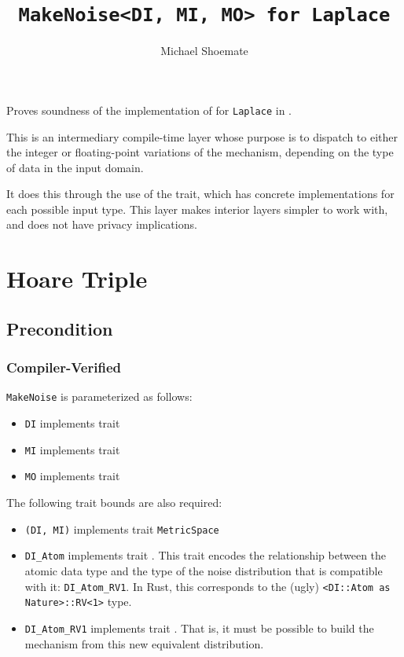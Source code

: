 \documentclass{article}
\title{\texttt{MakeNoise<DI, MI, MO> for Laplace}}
\author{Michael Shoemate}
\date{}
\begin{document}
\maketitle

\contrib
Proves soundness of the implementation of  
for \texttt{Laplace} in .

This is an intermediary compile-time layer whose purpose is 
to dispatch to either the integer or floating-point variations of the mechanism,
depending on the type of data in the input domain.

It does this through the use of the  trait,
which has concrete implementations for each possible input type.
This layer makes interior layers simpler to work with, and does not have privacy implications.

\section{Hoare Triple}
\subsection*{Precondition}
\subsubsection*{Compiler-Verified}
\texttt{MakeNoise} is parameterized as follows:
\begin{itemize}
    \item \texttt{DI} implements trait 
    \item \texttt{MI} implements trait 
    \item \texttt{MO} implements trait 
\end{itemize}

The following trait bounds are also required:
\begin{itemize}
    \item \texttt{(DI, MI)} implements trait \texttt{MetricSpace}
    \item \texttt{DI\_Atom} implements trait .
        This trait encodes the relationship between the atomic data type 
        and the type of the noise distribution that is compatible with it: \texttt{DI\_Atom\_RV1}.
        In Rust, this corresponds to the (ugly) \texttt{<DI::Atom as Nature>::RV<1>} type.
    \item \texttt{DI\_Atom\_RV1} implements trait .
        That is, it must be possible to build the mechanism from this new equivalent distribution.
\end{itemize}
\end{document}
